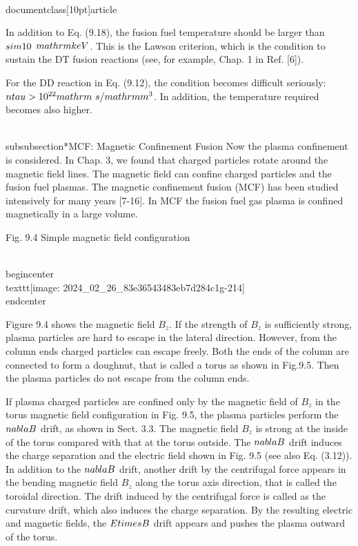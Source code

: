 \\documentclass[10pt]{article}
\begin{document}
{{{{{{In addition to Eq. (9.18), the fusion fuel temperature should be larger than $\\sim 10$ $\\mathrm{keV}$. This is the Lawson criterion, which is the condition to sustain the DT fusion reactions (see, for example, Chap. 1 in Ref. [6]).

For the DD reaction in Eq. (9.12), the condition becomes difficult seriously: $n \\tau>10^{22} \\mathrm{~s} / \\mathrm{m}^{3}$. In addition, the temperature required becomes also higher.

\\subsubsection*{MCF: Magnetic Confinement Fusion}
Now the plasma confinement is considered. In Chap. 3, we found that charged particles rotate around the magnetic field lines. The magnetic field can confine charged particles and the fusion fuel plasmas. The magnetic confinement fusion (MCF) has been studied intensively for many years [7-16]. In MCF the fusion fuel gas plasma is confined magnetically in a large volume.

Fig. 9.4 Simple magnetic field configuration

\\begin{center}
\\texttt{[image: 2024\_02\_26\_83e36543483eb7d284c1g-214]}
\\end{center}

Figure 9.4 shows the magnetic field $B_{z}$. If the strength of $B_{z}$ is sufficiently strong, plasma particles are hard to escape in the lateral direction. However, from the column ends charged particles can escape freely. Both the ends of the column are connected to form a doughnut, that is called a torus as shown in Fig.9.5. Then the plasma particles do not escape from the column ends.

If plasma charged particles are confined only by the magnetic field of $B_{z}$ in the torus magnetic field configuration in Fig. 9.5, the plasma particles perform the $\\nabla B$ drift, as shown in Sect. 3.3. The magnetic field $B_{z}$ is strong at the inside of the torus compared with that at the torus outside. The $\\nabla B$ drift induces the charge separation and the electric field shown in Fig. 9.5 (see also Eq. (3.12)). In addition to the $\\nabla B$ drift, another drift by the centrifugal force appears in the bending magnetic field $B_{z}$ along the torus axis direction, that is called the toroidal direction. The drift induced by the centrifugal force is called as the curvature drift, which also induces the charge separation. By the resulting electric and magnetic fields, the $E \\times B$ drift appears and pushes the plasma outward of the torus.

}}}}}}
\end{document}

